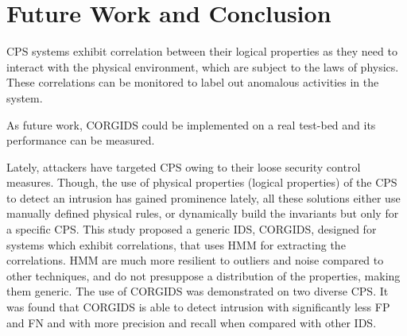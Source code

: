 
\chapter{\textbf{Future Work and Conclusion}}
\label{sec8:Conclusion}

\ac{CPS} systems exhibit correlation between their logical properties as they need to interact with the physical environment, which are subject to the laws of physics. These correlations can be monitored to label out anomalous activities in the system.

As future work, CORGIDS could be implemented on a real test-bed and its performance can be measured.

Lately, attackers have targeted \ac{CPS} owing to their loose security control measures. Though, the use of physical properties (logical properties) of the \ac{CPS} to detect an intrusion has gained prominence lately, all these solutions either use manually defined physical rules, or dynamically build the invariants but only for a specific \ac{CPS}. This study proposed a generic \ac{IDS}, \ac{CORGIDS}, designed for systems which exhibit correlations, that uses \acf{HMM} for extracting the correlations. \ac{HMM} are much more resilient to outliers and noise compared to other techniques, and do not presuppose a distribution of the properties, making them generic.
The use of \ac{CORGIDS} was demonstrated on two diverse \ac{CPS}. It was found that \ac{CORGIDS} is able to detect intrusion with significantly less \acf{FP} and \acf{FN} and with more precision and recall when compared with other \ac{IDS}. 
 \endinput
